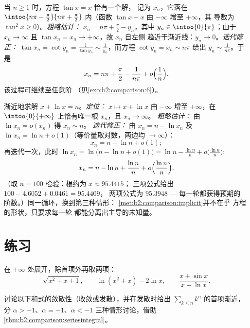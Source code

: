 \begin{example}\label{ex:b2:comparison:tan}
当 $n \geq 1$ 时，方程 $\tan x = x$ 恰有一个解，
记为 $x_n$，它落在 $\intoo{n\pi - \frac\pi2}{n\pi + \frac\pi2}$ 内（函数
$\tan x - x$ 由 $-\infty$ 增至 $+\infty$，其
导数为 $\tan^2 x \geq 0$）。\emph{粗略估计：} $x_n = n\pi +
\frac\pi2 - y_n$，其中 $y_n \in \intoo{0}{\pi}$；由于 $x_n \to
\infty$ 且 $\tan x_n = x_n \to +\infty$，故 $x_n$ 自左侧
趋近于渐近线：$y_n \to 0$。\emph{迭代修正：} $\tan x_n =
\cot y_n = \frac{1}{\tan y_n} \sim \frac{1}{y_n}$，而方程
$\cot y_n = x_n \sim n\pi$ 给出 $y_n \sim \frac{1}{n\pi}$。于是
\[
x_n = n\pi + \frac\pi2 - \frac{1}{n\pi} +
o\Bigl(\frac1n\Bigr),
\]
该过程可继续至任意阶
（见\cref{exo:b2:comparison:6}）。
\end{example}

\begin{example}[方法的第二次应用]\label{ex:b2:comparison:xplusln}
渐近地求解 $x + \ln x = n$。\emph{定位：} $x
\mapsto x + \ln x$ 由 $-\infty$ 增至 $+\infty$，在
$\intoo{0}{+\infty}$ 上恰有唯一根 $x_n$，且 $x_n \to \infty$。
\emph{粗略估计：} 由 $\ln x_n = o(x_n)$ 得 $x_n \sim n$。
\emph{迭代修正：} 由 $x_n = n - \ln x_n$ 及 $\ln x_n = \ln n
+ o(1)$（等价量取对数，两边均 $\to \infty$）：
\[
x_n = n - \ln n + o(1) ;
\]
再迭代一次，此时 $\ln x_n = \ln\bigl(n - \ln n + o(1)\bigr) =
\ln n - \frac{\ln n}{n} + o\bigl(\frac{\ln n}n\bigr)$:
\[
x_n = n - \ln n + \frac{\ln n}{n} +
o\Bigl(\frac{\ln n}{n}\Bigr).
\]
（取 $n = 100$ 检验：根约为 $x \approx 95.4415$；
三项公式给出 $100 - 4.6052 + 0.0461 = 95.4409$，
两项公式为 $95.3948$ --- 每一轮都获得预期的
阶数。）同一循环，换到第三种情形：
\cref{met:b2:comparison:implicit}并不在乎
方程的形状，只要求每一轮
都能分离出主导的未知量。
\end{example}

\section{练习}

\begin{exercise}[$\star$]\label{exo:b2:comparison:1}
在 $+\infty$ 处展开，除首项外再取两项：
\[
\sqrt{x^2 + x + 1} ,
\qquad
\ln(x^2 + x) - 2\ln x,
\qquad
\frac{x + \sin x}{x - \ln x} .
\]
\end{exercise}

\begin{exercise}[$\star$]\label{exo:b2:comparison:2}
讨论以下和式的敛散性（收敛或发散），并在发散时给出
$\sum_{k \leq n} k^\alpha$ 的首项渐近，分 $\alpha >
-1$、$\alpha = -1$、$\alpha < -1$ 三种情形讨论，借助
\cref{thm:b2:comparison:seriesintegral}。
\end{exercise}

